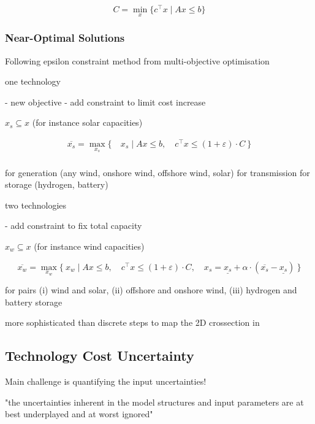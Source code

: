 \begin{equation}
    C = \min_x\{c^\top x \mid Ax\leq b\}
\end{equation}

\subsubsection{Near-Optimal Solutions}

Following \cite{nearoptimal}
epsilon constraint method from multi-objective optimisation \cite{mavrotas_effective_2009}

one technology

- new objective
- add constraint to limit cost increase

$x_s\subseteq x$ (for instance solar capacities)

\begin{align}
    \overline{x_s} = \max_{x_s}\{\:&x_s \mid Ax\leq b,\quad c^\top x\leq (1+\varepsilon)\cdot C \:\} \\
\end{align}

for generation (any wind, onshore wind, offshore wind, solar)
for transmission
for storage (hydrogen, battery)

two technologies

- add constraint to fix total capacity

$x_w\subseteq x$ (for instance wind capacities)

\begin{equation}
    \overline{x_w} = \max_{x_w}\{\:x_w \mid Ax\leq b,\quad c^\top x\leq (1+\varepsilon)\cdot C, \quad x_s = \underline{x_s} + \alpha \cdot (\overline{x_s}-\underline{x_s}) \:\}
\end{equation}

for pairs
(i) wind and solar,
(ii) offshore and onshore wind,
(iii) hydrogen and battery storage

more sophisticated than discrete steps to map the 2D crossection in \cite{pedersen_modeling_2020}

\subsection{Technology Cost Uncertainty}
\label{sec:uncertainty}

Main challenge is quantifying the input uncertainties! \cite{moret_characterization_2017}

"the uncertainties inherent in the model structures and input parameters are at best underplayed and at worst ignored" \cite{yue_review_2018}

